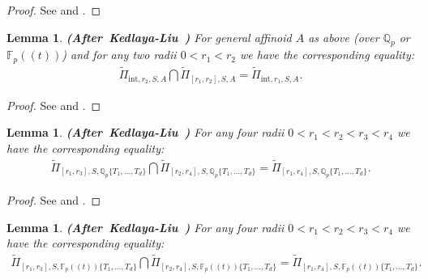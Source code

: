 \documentclass[12pt]{amsart}
\newtheorem{lemma}[theorem]{Lemma}
\theoremstyle{definition}
\numberwithin{equation}{section}
\begin{document}
\begin{proof}
See \cite[Lemma 5.2.6]{KL2} and \cite[Proposition 2.13]{XT2}.	
\end{proof}


\begin{lemma} \mbox{\bf{(After Kedlaya-Liu \cite[Lemma 5.2.6]{KL2})}}
For general affinoid $A$ as above (over $\mathbb{Q}_p$ or $\mathbb{F}_p((t))$) and for any two radii $0<r_1<r_2$ we have the corresponding equality:
\begin{align}
\widetilde{\Pi}_{\mathrm{int},r_2,S,A}\bigcap \widetilde{\Pi}_{[r_1,r_2],S,A}	=\widetilde{\Pi}_{\mathrm{int},r_1,S,A}.
\end{align}

\end{lemma}


\begin{proof}
See \cite[Lemma 5.2.6]{KL2} and \cite[Proposition 2.14]{XT2}.	
\end{proof}



\begin{lemma} \mbox{\bf{(After Kedlaya-Liu \cite[Lemma 5.2.10]{KL2})}}
For any four radii $0<r_1<r_2<r_3<r_4$ we have the corresponding equality:
\begin{align}
\widetilde{\Pi}_{[r_1,r_3],S,\mathbb{Q}_p\{T_1,...,T_d\}}\bigcap \widetilde{\Pi}_{[r_2,r_4],S,\mathbb{Q}_p\{T_1,...,T_d\}}	=\widetilde{\Pi}_{[r_1,r_4],S,\mathbb{Q}_p\{T_1,...,T_d\}}.
\end{align}

\end{lemma}


\begin{proof}
See \cite[Lemma 5.2.10]{KL2} and \cite[Proposition 2.16]{XT2}.	
\end{proof}





\begin{lemma} \mbox{\bf{(After Kedlaya-Liu \cite[Lemma 5.2.10]{KL2})}}
For any four radii $0<r_1<r_2<r_3<r_4$ we have the corresponding equality:
\begin{align}
\widetilde{\Pi}_{[r_1,r_3],S,\mathbb{F}_p((t))\{T_1,...,T_d\}}\bigcap \widetilde{\Pi}_{[r_2,r_4],S,\mathbb{F}_p((t))\{T_1,...,T_d\}}	=\widetilde{\Pi}_{[r_1,r_4],S,\mathbb{F}_p((t))\{T_1,...,T_d\}}.
\end{align}

\end{lemma}
\end{document}
